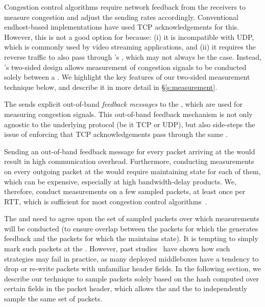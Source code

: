 \label{s:design:twosided}
Congestion control algorithms require network feedback from the receivers to measure congestion and adjust the sending rates accordingly. Conventional endhost-based implementations have used TCP acknowledgements for this. However, this is not a good option for \name because: (i) it is incompatible with UDP, which is commonly used by video streaming applications, and (ii) it requires the reverse traffic to also pass through \name's \inbox, which may not always be the case.  
 Instead, \name's two-sided design allows measurement of congestion signals to be conducted solely between a \pair. We highlight the key features of our two-sided measurement technique below, and describe it in more detail in \S\ref{s:measurement}. 

The \outbox sends explicit out-of-band \emph{feedback messages} to the \inbox, which are used for measuring congestion signals. 
This out-of-band feedback mechanism is not only agnostic to the underlying protocol (be it TCP or UDP), but also side-steps the issue of enforcing that TCP acknowledgements pass through the same \inbox.

 Sending an out-of-band feedback message for every packet arriving at the \outbox would result in high communication overhead. Furthermore, conducting measurements on every outgoing packet at the \inbox would require maintaining state for each of them, which can be expensive, especially at high bandwidth-delay products. We, therefore, conduct measurements on a few sampled packets, at least once per RTT, which is sufficient for most congestion control algorithms~\cite{ccp}. 

 The \inbox and \outbox need to agree upon the set of sampled packets over which measurements will be conducted (to ensure overlap between the packets for which the \outbox generates feedback and the packets for which the \inbox maintains state). It is tempting to simply mark such packets at the \inbox. However, past studies~\cite{ipoptions, mboxbadness, quic} have shown how such strategies may fail in practice, as many deployed middleboxes have a tendency to drop or re-write packets with unfamiliar header fields. 
In the following section, we describe our technique to sample packets solely based on the hash computed over certain fields in the packet header, which allows the \inbox and the \outbox to independently sample the same set of packets.

